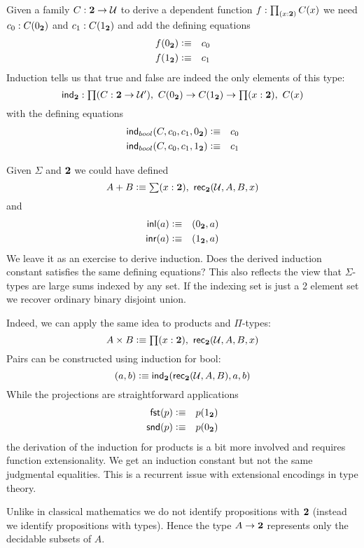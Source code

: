 Given a family $C : \mathbf{2} \to \mathcal{U}$ to derive a dependent function 
$f : \prd{x:\bool}C(x)$ we need $c_0:C(0_{\mathbf{2}})$ and $c_1 : C(1_{\mathbf{2}})$ and
add the defining equations
\begin{eqnarray*}
  f(0_{\mathbf{2}}) & \vcentcolon\equiv & c_0 \\
  f(1_{\mathbf{2}}) & \vcentcolon\equiv & c_1
\end{eqnarray*}
Induction tells us that true and false are indeed the only
elements of this type:
\[ \ind{\bool} : \prd{C:\bool \to \UU'}  C(\bfalse) \to C(\btrue)
\to \prd{x:\bool} C(x) \]
with the defining equations
\begin{eqnarray*}
  \mathsf{ind}_{bool}(C,c_0,c_1,0_{\mathbf{2}}) & \vcentcolon\equiv & c_0 \\
  \mathsf{ind}_{bool}(C,c_0,c_1,1_{\mathbf{2}}) & \vcentcolon\equiv & c_1
\end{eqnarray*}

Given $\Sigma$ and $\mathbf{2}$ we could have defined
\[ A + B \defeq \sm{x:\bool} \rec{\bool}(\UU,A,B,x) \]
and
\begin{eqnarray*}
  \mathsf{inl}(a) & \vcentcolon\equiv & ( 0_{\mathbf{2}},a) \\
  \mathsf{inr}(a) & \vcentcolon\equiv & ( 1_{\mathbf{2}},a) \\
\end{eqnarray*}
We leave it as an exercise to derive induction. Does the derived
induction constant satisfies the same defining equations?
This also reflects the view that $\Sigma$-types are large sums 
indexed by any set. If the indexing set is just a 2 element set we
recover ordinary binary disjoint union.

Indeed, we can apply the same idea to products and $\Pi$-types:
\[ A \times B \defeq \prd{x:\bool}\rec{\bool}(\UU,A,B,x) \]
Pairs can be constructed using induction for bool:
\[ ( a,b) \vcentcolon\equiv \mathsf{ind}_{\mathbf{2}}(\mathsf{rec}_{\mathbf{2}}(\mathcal{U},A,B),a,b) \]
While the projections are straightforward applications
\begin{eqnarray*}
  \mathsf{fst}(p) & \vcentcolon\equiv & p(1_{\mathbf{2}}) \\
  \mathsf{snd}(p) & \vcentcolon\equiv & p(0_{\mathbf{2}}) \\
\end{eqnarray*}
the derivation of the induction for products is a bit more
involved and requires function extensionality. We get an
induction constant but not the same judgmental equalities.
This is a recurrent issue with extensional encodings in type
theory. 

Unlike in classical mathematics we
do not identify propositions with $\mathbf{2}$ (instead we identify
propositions with types). Hence the type $A \to \mathbf{2}$ 
represents only the decidable subsets of $A$.

